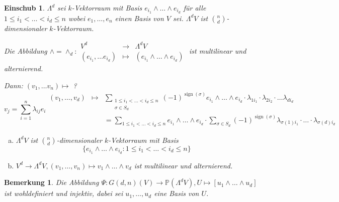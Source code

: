 \documentclass[a4paper, 12pt, numbers=noendperiod, chapterprefix=true, headsepline]{scrbook}
\theoremstyle{break}
\newtheorem{Bem}[Def]{Bemerkung}
\newtheorem{Einsch}[Def]{Einschub}
\theoremstyle{nonumberbreak}
\theoremstyle{nonumberplain}
\newcommand{\Sum}{\sum\limits}
\DeclareMathOperator{\sign}{sign}
\newcommand{\IP}{\mathbb{P}}%
\begin{document}
\begin{Einsch}
$\Lambda^d$ sei $k$-Vektorraum mit Basis $e_{i_1}\wedge\ldots \wedge e_{i_d}$ f\"ur alle $1\le i_1 < \ldots < i_d \le n$ wobei $e_1,\ldots ,e_n$ einen Basis von $V$ sei. $\Lambda^dV$ ist $\binom{n}{d}$-dimensionaler $k$-Vektorraum.

Die Abbildung $\wedge=\wedge_d:\begin{array}{rcl} V^d &\to& \Lambda^dV\\ (e_{i_1},\ldots e_{i_d}) &\mapsto& (e_{i_1}\wedge\ldots \wedge e_{i_d})\end{array}$ ist multilinear und alternierend.\

\emph{Dann}: $(v_1,\ldots v_n)\mapsto$ ?
	\[v_j=\Sum_{i=1}^n\lambda_{ij}e_i
	\begin{array}{rcl}
		(v_1,\ldots ,v_d)&\mapsto& \Sum_{\substack{1\le i_1<\ldots <i_d\le n\\\sigma \in S_d}}(-1)^{\sign(\sigma)}e_{i_1}\wedge\ldots \wedge e_{i_d}\cdot \lambda_{1i_1}\cdot \lambda_{2i_2}\cdot\ldots \lambda_{di_d} \\
		&&= \Sum_{1\le i_1 <\ldots <i_d\le n} e_{i_1}\wedge\ldots \wedge e_{i_d}\cdot \Sum_{\sigma \in S_d}(-1)^{\sign(\sigma)}\lambda_{\sigma(1)i_1}\cdot \ldots \cdot \lambda_{\sigma(d)i_d}
	\end{array}\]
\begin{enumerate}[a)]

\item
	$\Lambda^dV$ ist $\binom{n}{d}$-dimensionaler $k$-Vektorraum mit Basis
		\[\{  e_{i_1}\wedge\ldots \wedge e_{i_d} : 1\le i_1 <\ldots <i_d\le n \}\]
\item
	$V^d\to \Lambda^dV, (v_1,\ldots ,v_n)\mapsto v_1\wedge\ldots \wedge v_d$ ist multilinear und alternierend.
\end{enumerate}\end{Einsch}

\begin{Bem}
Die Abbildung $\Psi:G(d,n)(V)\to \IP(\Lambda^dV), U\mapsto [u_1\wedge\ldots \wedge u_d]$ ist wohldefiniert und injektiv, dabei sei $u_1,\ldots ,u_d$ eine Basis von $U$.
\end{Bem}
\end{document}
